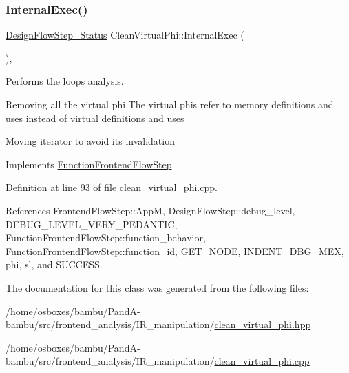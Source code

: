 \subsubsection{\texorpdfstring{Internal\+Exec()}{InternalExec()}}
{\footnotesize\ttfamily \hyperlink{design__flow__step_8hpp_afb1f0d73069c26076b8d31dbc8ebecdf}{Design\+Flow\+Step\+\_\+\+Status} Clean\+Virtual\+Phi\+::\+Internal\+Exec (\begin{DoxyParamCaption}{ }\end{DoxyParamCaption})\hspace{0.3cm}{\ttfamily [override]}, {\ttfamily [virtual]}}



Performs the loops analysis. 

Removing all the virtual phi The virtual phis refer to memory definitions and uses instead of virtual definitions and uses

Moving iterator to avoid its invalidation 

Implements \hyperlink{classFunctionFrontendFlowStep_a00612f7fb9eabbbc8ee7e39d34e5ac68}{Function\+Frontend\+Flow\+Step}.



Definition at line 93 of file clean\+\_\+virtual\+\_\+phi.\+cpp.



References Frontend\+Flow\+Step\+::\+AppM, Design\+Flow\+Step\+::debug\+\_\+level, D\+E\+B\+U\+G\+\_\+\+L\+E\+V\+E\+L\+\_\+\+V\+E\+R\+Y\+\_\+\+P\+E\+D\+A\+N\+T\+IC, Function\+Frontend\+Flow\+Step\+::function\+\_\+behavior, Function\+Frontend\+Flow\+Step\+::function\+\_\+id, G\+E\+T\+\_\+\+N\+O\+DE, I\+N\+D\+E\+N\+T\+\_\+\+D\+B\+G\+\_\+\+M\+EX, phi, sl, and S\+U\+C\+C\+E\+SS.



The documentation for this class was generated from the following files\+:\begin{DoxyCompactItemize}
\item 
/home/osboxes/bambu/\+Pand\+A-\/bambu/src/frontend\+\_\+analysis/\+I\+R\+\_\+manipulation/\hyperlink{clean__virtual__phi_8hpp}{clean\+\_\+virtual\+\_\+phi.\+hpp}\item 
/home/osboxes/bambu/\+Pand\+A-\/bambu/src/frontend\+\_\+analysis/\+I\+R\+\_\+manipulation/\hyperlink{clean__virtual__phi_8cpp}{clean\+\_\+virtual\+\_\+phi.\+cpp}\end{DoxyCompactItemize}
